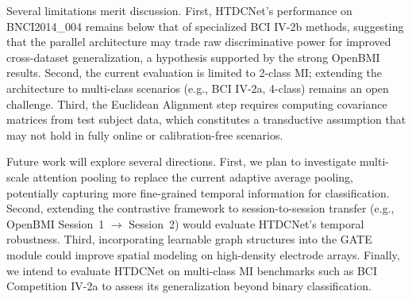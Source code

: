 \documentclass[conference]{IEEEtran}
\begin{document}
Several limitations merit discussion.
First, HTDCNet's performance on BNCI2014\_004 remains below that of specialized BCI IV-2b methods, suggesting that the parallel architecture may trade raw discriminative power for improved cross-dataset generalization, a hypothesis supported by the strong OpenBMI results.
Second, the current evaluation is limited to 2-class MI; extending the architecture to multi-class scenarios (e.g., BCI IV-2a, 4-class) remains an open challenge.
Third, the Euclidean Alignment step requires computing covariance matrices from test subject data, which constitutes a transductive assumption that may not hold in fully online or calibration-free scenarios.

Future work will explore several directions.
First, we plan to investigate multi-scale attention pooling to replace the current adaptive average pooling, potentially capturing more fine-grained temporal information for classification.
Second, extending the contrastive framework to session-to-session transfer (e.g., OpenBMI Session~1 $\to$ Session~2) would evaluate HTDCNet's temporal robustness.
Third, incorporating learnable graph structures into the GATE module could improve spatial modeling on high-density electrode arrays.
Finally, we intend to evaluate HTDCNet on multi-class MI benchmarks such as BCI Competition IV-2a to assess its generalization beyond binary classification.
\end{document}

